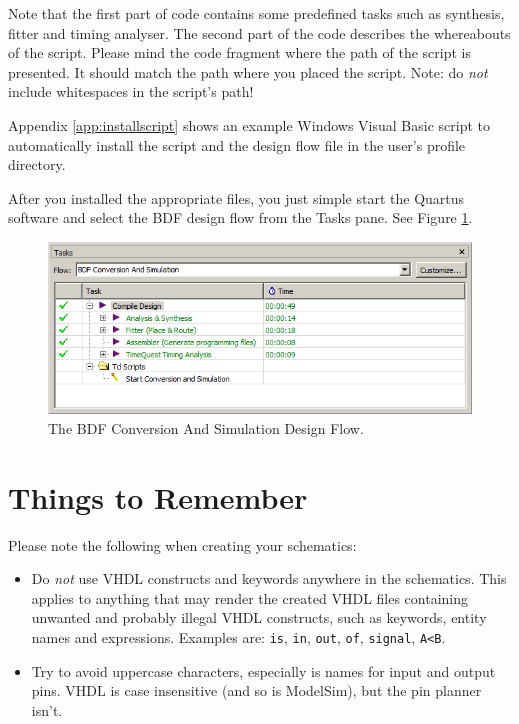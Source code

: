 \documentclass[11pt,a4paper,final,oneside,titlepage,fleqn]{article}
\begin{document}
Note that the first part of code contains some predefined tasks such as
synthesis, fitter and timing analyser. The second part of the code describes
the whereabouts of the script. Please mind the code fragment where the path
of the script is presented. It should match the path where you placed the
script. Note: do \textit{not} include whitespaces in the script's path!

Appendix \ref{app:installscript} shows an example Windows Visual Basic script to
automatically install the script and the design flow file in the user's profile
directory.



After you installed the appropriate files, you just simple start the
Quartus software and select the BDF design flow from the Tasks pane.
See Figure \ref{020useofdesignflow}.

\begin{figure}[h!]
  \centering
  \includegraphics[scale=0.44]{020useofdesignflow.png}
  \caption{The BDF Conversion And Simulation Design Flow.}
  \label{020useofdesignflow}
\end{figure}


\section{Things to Remember}
\label{sec:remember}
Please note the following when creating your schematics:
\begin{itemize}[itemsep=0pt]
\item Do \emph{not} use VHDL constructs and keywords anywhere in the
schematics. This applies to anything that may render the created VHDL files
containing unwanted and probably illegal VHDL constructs, such as keywords,
entity names and expressions. Examples are: \texttt{is},
\texttt{in}, \texttt{out}, \texttt{of}, \texttt{signal}, \texttt{A<B}.
\item Try to avoid uppercase characters, especially is names for input and
output pins. VHDL is case insensitive (and so is ModelSim), but the pin
planner isn't.
\end{itemize}
\end{document}
